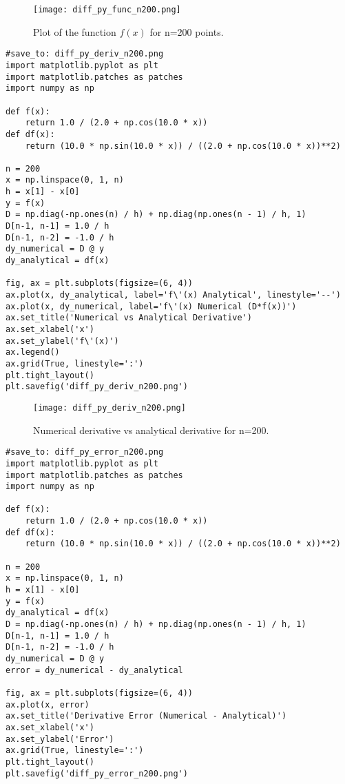 \documentclass{article}
\begin{document}
\begin{figure}[H]
\centering
\texttt{[image: diff\_py\_func\_n200.png]}
\caption{Plot of the function $f(x)$ for n=200 points.}
\label{fig:diff_py_func_n200}
\end{figure}

\begin{verbatim}
#save_to: diff_py_deriv_n200.png
import matplotlib.pyplot as plt
import matplotlib.patches as patches
import numpy as np

def f(x):
    return 1.0 / (2.0 + np.cos(10.0 * x))
def df(x):
    return (10.0 * np.sin(10.0 * x)) / ((2.0 + np.cos(10.0 * x))**2)

n = 200
x = np.linspace(0, 1, n)
h = x[1] - x[0]
y = f(x)
D = np.diag(-np.ones(n) / h) + np.diag(np.ones(n - 1) / h, 1)
D[n-1, n-1] = 1.0 / h
D[n-1, n-2] = -1.0 / h
dy_numerical = D @ y
dy_analytical = df(x)

fig, ax = plt.subplots(figsize=(6, 4))
ax.plot(x, dy_analytical, label='f\'(x) Analytical', linestyle='--')
ax.plot(x, dy_numerical, label='f\'(x) Numerical (D*f(x))')
ax.set_title('Numerical vs Analytical Derivative')
ax.set_xlabel('x')
ax.set_ylabel('f\'(x)')
ax.legend()
ax.grid(True, linestyle=':')
plt.tight_layout()
plt.savefig('diff_py_deriv_n200.png')
\end{verbatim}

\begin{figure}[H]
\centering
\texttt{[image: diff\_py\_deriv\_n200.png]}
\caption{Numerical derivative vs analytical derivative for n=200.}
\label{fig:diff_py_deriv_n200}
\end{figure}

\begin{verbatim}
#save_to: diff_py_error_n200.png
import matplotlib.pyplot as plt
import matplotlib.patches as patches
import numpy as np

def f(x):
    return 1.0 / (2.0 + np.cos(10.0 * x))
def df(x):
    return (10.0 * np.sin(10.0 * x)) / ((2.0 + np.cos(10.0 * x))**2)

n = 200
x = np.linspace(0, 1, n)
h = x[1] - x[0]
y = f(x)
dy_analytical = df(x)
D = np.diag(-np.ones(n) / h) + np.diag(np.ones(n - 1) / h, 1)
D[n-1, n-1] = 1.0 / h
D[n-1, n-2] = -1.0 / h
dy_numerical = D @ y
error = dy_numerical - dy_analytical

fig, ax = plt.subplots(figsize=(6, 4))
ax.plot(x, error)
ax.set_title('Derivative Error (Numerical - Analytical)')
ax.set_xlabel('x')
ax.set_ylabel('Error')
ax.grid(True, linestyle=':')
plt.tight_layout()
plt.savefig('diff_py_error_n200.png')
\end{verbatim}
\end{document}
